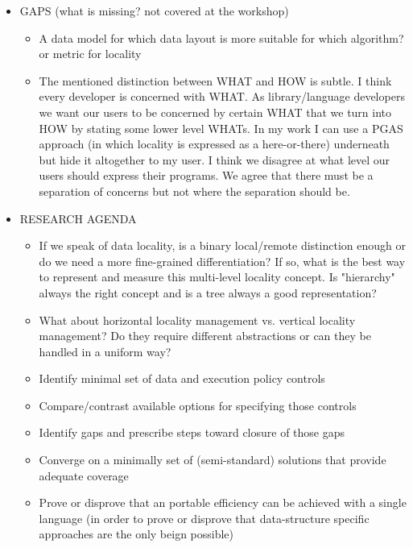 \begin{itemize}
\item GAPS (what is missing? not covered at the workshop)
  \begin{itemize}
  \item A data model for which data layout is more suitable for which algorithm? or metric for locality
  \item The mentioned distinction between WHAT and HOW is subtle. I think every developer is concerned with WHAT. As library/language developers we want our users to be concerned by certain WHAT that we turn into HOW by stating some lower level WHATs. In my work I can use a PGAS approach (in which locality is expressed as a here-or-there) underneath but hide it altogether to my user. I think we disagree at what level our users should express their programs. We agree that there must be a separation of concerns but not where the separation should be.
  \end{itemize}

\item RESEARCH AGENDA
  \begin{itemize}
\item If we speak of data locality, is a binary local/remote distinction enough or do we need a more fine-grained differentiation? If so, what is the best way to represent and measure this multi-level locality concept. Is "hierarchy" always the right concept and is a tree always a good representation?

\item What about horizontal locality management vs. vertical locality management? Do they require different abstractions or can they be handled in a uniform way?

  \item Identify minimal set of data and execution policy controls
  \item Compare/contrast available options for specifying those controls
  \item Identify gaps and prescribe steps toward closure of those gaps
  \item Converge on a minimally set of (semi-standard) solutions that provide adequate coverage
  \item Prove or disprove that an portable efficiency can be achieved with a single language (in order to prove or disprove that data-structure specific approaches are the only beign possible)
  \end{itemize}

\end{itemize}



